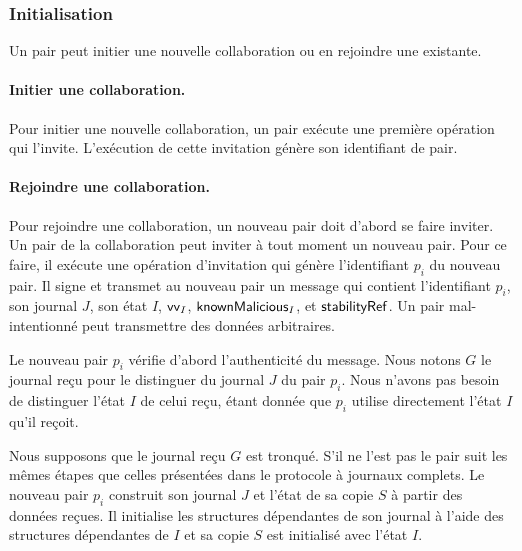 \subsubsection{Initialisation}

Un pair peut initier une nouvelle collaboration ou en rejoindre une existante.

\paragraph{Initier une collaboration.}
Pour initier une nouvelle collaboration, un pair exécute une première opération qui l'invite. L'exécution de cette invitation génère son identifiant de pair.

\paragraph{Rejoindre une collaboration.}
Pour rejoindre une collaboration, un nouveau pair doit d'abord se faire inviter.
Un pair de la collaboration peut inviter à tout moment un nouveau pair. Pour ce faire, il exécute une opération d'invitation qui génère l'identifiant $p_i$ du nouveau pair.
Il signe et transmet au nouveau pair un message qui contient l'identifiant $p_i$, son journal $J$, son état $I$, $\operatorname{\mathsf{vv}}_I$, $\operatorname{\mathsf{knownMalicious}}_I$, et $\operatorname{\mathsf{stabilityRef}}$.
Un pair mal-intentionné peut transmettre des données arbitraires.

Le nouveau pair $p_i$ vérifie d'abord l'authenticité du message.
Nous notons $G$ le journal reçu pour le distinguer du journal $J$ du pair $p_i$.
Nous n'avons pas besoin de distinguer l'état $I$ de celui reçu, étant donnée que $p_i$ utilise directement l'état $I$ qu'il reçoit.

Nous supposons que le journal reçu $G$ est tronqué.
S'il ne l'est pas le pair suit les mêmes étapes que celles présentées dans le protocole à journaux complets.
Le nouveau pair $p_i$ construit son journal $J$ et l'état de sa copie $S$ à partir des données reçues.
Il initialise les structures dépendantes de son journal à l'aide des structures dépendantes de $I$ et sa copie $S$ est initialisé avec l'état $I$.

\clearpage

